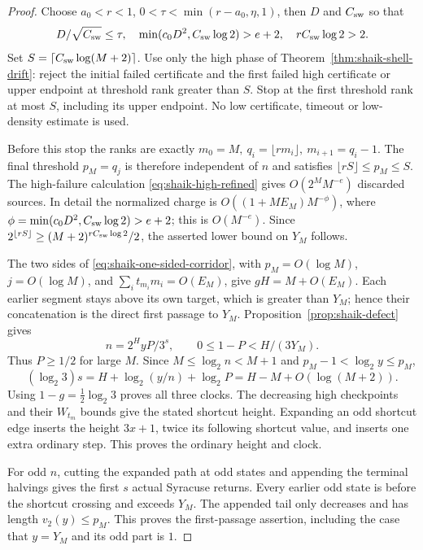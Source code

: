\documentclass[11pt]{article}
\theoremstyle{remark}\newtheorem{remark}[proposition]{Remark}
\begin{document}
\begin{proof}
Choose \(a_0<r<1\), \(0<\tau<\min(r-a_0,\eta,1)\), then \(D\)
and \(C_{\rm sw}\) so that
\[
 D/\sqrt{C_{\rm sw}}\le\tau,\quad
 \min(c_0D^2,C_{\rm sw}\log2)>e+2,\quad
 rC_{\rm sw}\log2>2.
\]
Set \(S=\lceil C_{\rm sw}\log(M+2)\rceil\). Use only the high
phase of Theorem~\ref{thm:shaik-shell-drift}: reject the initial
failed certificate and the first failed high certificate or upper
endpoint at threshold rank greater than \(S\). Stop at the first
threshold rank at most \(S\), including its upper endpoint.
No low certificate, timeout or low-density estimate is used.

Before this stop the ranks are exactly
\(m_0=M,\ q_i=\lfloor rm_i\rfloor,\ m_{i+1}=q_i-1\).
The final threshold \(p_M=q_j\) is therefore independent of \(n\)
and satisfies \(\lfloor rS\rfloor\le p_M\le S\).
The high-failure calculation \eqref{eq:shaik-high-refined} gives
\(O(2^M M^{-e})\) discarded sources. In detail the normalized
charge is \(O((1+ME_M)M^{-\phi})\), where
\(\phi=\min(c_0D^2,C_{\rm sw}\log2)>e+2\); this is \(O(M^{-e})\).
Since \(2^{\lfloor rS\rfloor}\ge (M+2)^{rC_{\rm sw}\log2}/2\),
the asserted lower bound on \(Y_M\) follows.

The two sides of \eqref{eq:shaik-one-sided-corridor}, with
\(p_M=O(\log M)\), \(j=O(\log M)\), and
\(\sum_i t_{m_i}m_i=O(E_M)\), give \(gH=M+O(E_M)\).
Each earlier segment stays above its own target, which is greater
than \(Y_M\); hence their concatenation is the direct first passage
to \(Y_M\). Proposition~\ref{prop:shaik-defect} gives
\[
 n=2^HyP/3^s,\qquad 0\le1-P<H/(3Y_M).
\]
Thus \(P\ge1/2\) for large \(M\). Since
\(M\le\log_2n<M+1\) and \(p_M-1<\log_2y\le p_M\),
\[
 (\log_2 3)s=H+\log_2(y/n)+\log_2P
            =H-M+O(\log(M+2)).
\]
Using \(1-g=\tfrac12\log_2 3\) proves all three clocks.
The decreasing high checkpoints and their \(W_{t_m}\) bounds give
the stated shortcut height. Expanding an odd shortcut edge inserts
the height \(3x+1\), twice its following shortcut value, and inserts
one extra ordinary step. This proves the ordinary height and clock.

For odd \(n\), cutting the expanded path at odd states and appending
the terminal halvings gives the first \(s\) actual Syracuse returns.
Every earlier odd state is before the shortcut crossing and exceeds
\(Y_M\). The appended tail only decreases and has length
\(v_2(y)\le p_M\). This proves the first-passage assertion, including
the case that \(y=Y_M\) and its odd part is \(1\).
\end{proof}
\end{document}
